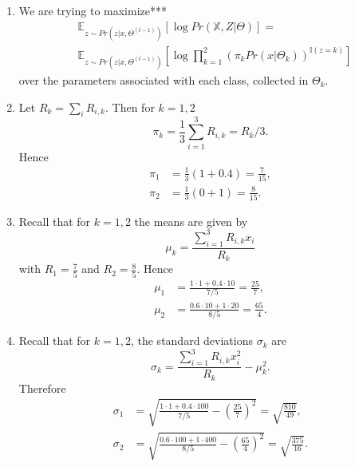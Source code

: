 \documentclass{article}
\begin{document}
\begin{enumerate}
    \item We are trying to maximize***
    \begin{align*}
        &\mathbb{E}_{z\sim Pr(z|x,\Theta^{(t-1)})}\left[\log Pr(\mathbb{X},Z|\Theta) \right]=\\
        &\mathbb{E}_{z\sim Pr(z|x,\Theta^{(t-1)})}\left[\log \prod_{k=1}^2\left(\pi_k Pr(x|\Theta_k) \right)^{\mathbb{I}(z=k)} \right]
    \end{align*}
    over the parameters associated with each class, collected in $\Theta_k$. 
    \item Let $R_k = \sum_i R_{i,k}$. Then for $k=1,2$
    \[
        \pi_k = \frac13\sum^3_{i=1}R_{i,k} = R_k / 3.
    \]
    Hence
    \begin{align*}
        \pi_1 &= \frac13(1+0.4)=\frac{7}{15},\\
        \pi_2 &= \frac13(0+1) = \frac{8}{15}.
    \end{align*}
    \item Recall that for $k=1,2$ the means are given by
    \[
        \mu_k = \frac{\sum_{i=1}^3R_{i,k}x_i}{R_k}
    \]
    with $R_1=\tfrac{7}{5}$ and $R_2=\tfrac{8}{5}$. Hence
    \begin{align*}
        \mu_1 &= \frac{1\cdot 1+0.4\cdot10}{7/5} = \frac{25}{7},\\
        \mu_2 &= \frac{0.6\cdot10+1\cdot20}{8/5} = \frac{65}{4}.
    \end{align*}
    \item Recall that for $k=1,2$, the standard deviations $\sigma_k$ are
    \[
        \sigma_k=\frac{\sum_{i=1}^3R_{i,k}x_i^2}{R_k} - \mu_k^2.
    \]
    Therefore
    \begin{align*}
        \sigma_1 &= \sqrt{\frac{1\cdot 1 + 0.4\cdot100}{7/5} -\left(\frac{25}{7}\right)^2} = \sqrt{\frac{810}{49}},\\
        \sigma_2 &= \sqrt{\frac{0.6\cdot 100+1\cdot400}{8/5}-\left(\frac{65}{4}\right)^2} = \sqrt{\frac{375}{16}}.
    \end{align*}
\end{enumerate}
\end{document}
